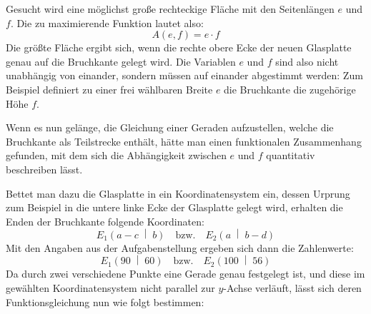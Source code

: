 \begin{exercise}
\begin{minipage}[b]{65mm}
{}
      \end{minipage}
  \fi
  \ifoutcome\outcome\par
    Gesucht wird eine möglichst große rechteckige
    Fläche mit den Seitenlängen $e$ und $f$.
    Die zu maximierende Funktion lautet also:
    \begin{equation*}
      A(e,f)=e\cdot f
    \end{equation*}
    Die größte Fläche ergibt sich, wenn die rechte
    obere Ecke der neuen Glasplatte genau auf die
    Bruchkante gelegt wird.
    Die Variablen $e$ und $f$ sind also nicht
    unabhängig von einander, sondern müssen
    auf einander abgestimmt werden:
    Zum Beispiel definiert zu einer frei wählbaren
    Breite $e$ die Bruchkante die zugehörige Höhe $f$.
    \par
    Wenn es nun gelänge, die Gleichung einer Geraden
    aufzustellen, welche die Bruchkante als
    Teilstrecke enthält, hätte man einen
    funktionalen Zusammenhang gefunden, mit
    dem sich die Abhängigkeit zwischen $e$ und
    $f$ quantitativ beschreiben lässt.
    \par
    Bettet man dazu die Glasplatte in ein
    Koordinatensystem ein, dessen Urprung zum
    Beispiel in die untere linke Ecke der
    Glasplatte gelegt wird, erhalten die Enden
    der Bruchkante folgende Koordinaten:
    \begin{equation*}
      E_1\left(a-c\;\middle|\;b\right)
      \quad\text{bzw.}\quad
      E_2\left(a\;\middle|\;b-d\right)
    \end{equation*}
    Mit den Angaben aus der Aufgabenstellung
    ergeben sich dann die Zahlenwerte:
    \begin{equation*}
      E_1\left(90\;\middle|\;60\right)
      \quad\text{bzw.}\quad
      E_2\left(100\;\middle|\;56\right)
    \end{equation*}
    Da durch zwei verschiedene Punkte eine Gerade
    genau festgelegt ist, und diese im gewählten
    Koordinatensystem nicht parallel zur $y$-Achse
    verläuft, lässt sich deren Funktionsgleichung
    nun wie folgt bestimmen:
    \begin{equation*}

\end{equation*}
\end{exercise}
